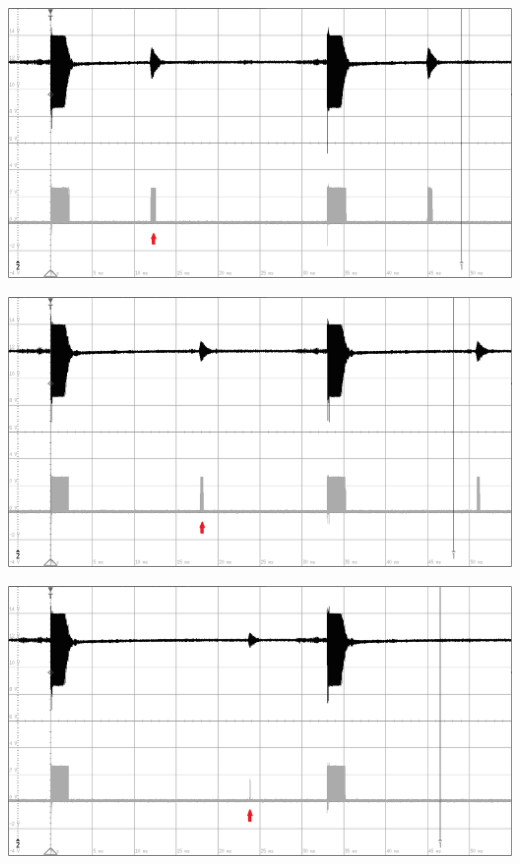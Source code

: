 \begin{minipage}{0.5\textwidth}
\includegraphics[width=1\textwidth%
]{Abbildungen/MessungenP2/5V/2mb.PNG}
\label{fig:5v2m}
\end{minipage}
\begin{minipage}{0.5\textwidth}
\includegraphics[width=1\textwidth%
]{Abbildungen/MessungenP2/5V/3mb.PNG}
\label{fig:5v3m}
\end{minipage}
\begin{minipage}{0.5\textwidth}
\includegraphics[width=1\textwidth%
]{Abbildungen/MessungenP2/5V/4mb.PNG}
\label{fig:5v4m}
\end{minipage}
